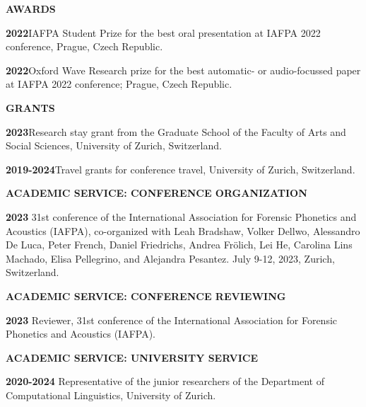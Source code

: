 \documentclass[11pt]{article}
\newcommand{\hangpara}{
 \setlength{\parindent}{0in} %
 \hangindent=0.42in %
}
\begin{document}
\vskip 20pt
\begin{flushleft}
{\bf AWARDS}
\end{flushleft}
\hangpara
{\bf 2022}\hspace{1ex}IAFPA Student Prize for the best oral presentation at IAFPA 2022 conference, Prague, Czech Republic.
\vskip 6pt
\hangpara
{\bf 2022}\hspace{1ex}Oxford Wave Research prize for the best automatic- or audio-focussed paper at IAFPA 2022 conference; Prague, Czech Republic. %




\vskip 20pt
\begin{flushleft}
{\bf GRANTS}
\end{flushleft}
\hangpara
{\bf 2023}\hspace{1ex}Research stay grant from the Graduate School of the Faculty of Arts and Social Sciences, University of Zurich, Switzerland. %
\vskip 6pt
\hangpara
{\bf 2019-2024}\hspace{1ex}Travel grants for conference travel, University of Zurich, Switzerland. %




\vskip 20pt
\begin{flushleft}
{\bf ACADEMIC SERVICE: CONFERENCE ORGANIZATION}
\end{flushleft}
\hangpara
{\bf 2023}\hspace{1ex} 31st conference of the International Association for Forensic Phonetics and Acoustics (IAFPA), co-organized with Leah Bradshaw, Volker Dellwo, Alessandro De Luca, Peter French, Daniel Friedrichs, Andrea Frölich, Lei He, Carolina Lins Machado, Elisa Pellegrino, and Alejandra Pesantez. July 9-12, 2023, Zurich, Switzerland.


\vskip 20pt
\begin{flushleft}
{\bf ACADEMIC SERVICE: CONFERENCE REVIEWING}
\end{flushleft}
\hangpara
{\bf 2023}\hspace{1ex} Reviewer, 31st conference of the International Association for Forensic Phonetics and Acoustics (IAFPA).




\vskip 20pt
\begin{flushleft}
{\bf ACADEMIC SERVICE: UNIVERSITY SERVICE}
\end{flushleft}
\hangpara
{\bf 2020-2024}\hspace{1ex} Representative of the junior researchers of the Department of Computational Linguistics, University of Zurich.
\end{document}
